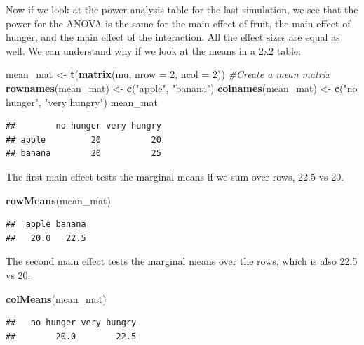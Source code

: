 \documentclass[
]{book}
\newenvironment{Shaded}{\begin{snugshade}}{\end{snugshade}}
\newcommand{\CommentTok}[1]{\textcolor[rgb]{0.56,0.35,0.01}{\textit{#1}}}
\newcommand{\DataTypeTok}[1]{\textcolor[rgb]{0.13,0.29,0.53}{#1}}
\newcommand{\DecValTok}[1]{\textcolor[rgb]{0.00,0.00,0.81}{#1}}
\newcommand{\KeywordTok}[1]{\textcolor[rgb]{0.13,0.29,0.53}{\textbf{#1}}}
\newcommand{\NormalTok}[1]{#1}
\newcommand{\StringTok}[1]{\textcolor[rgb]{0.31,0.60,0.02}{#1}}
\begin{document}
Now if we look at the power analysis table for the last simulation, we see that the power for the ANOVA is the same for the main effect of fruit, the main effect of hunger, and the main effect of the interaction. All the effect sizes are equal as well. We can understand why if we look at the means in a 2x2 table:

\begin{Shaded}
\begin{Highlighting}[]
\NormalTok{mean_mat <-}\StringTok{ }\KeywordTok{t}\NormalTok{(}\KeywordTok{matrix}\NormalTok{(mu, }
                     \DataTypeTok{nrow =} \DecValTok{2}\NormalTok{,}
                     \DataTypeTok{ncol =} \DecValTok{2}\NormalTok{)) }\CommentTok{#Create a mean matrix}
\KeywordTok{rownames}\NormalTok{(mean_mat) <-}\StringTok{ }\KeywordTok{c}\NormalTok{(}\StringTok{"apple"}\NormalTok{, }\StringTok{"banana"}\NormalTok{)}
\KeywordTok{colnames}\NormalTok{(mean_mat) <-}\StringTok{ }\KeywordTok{c}\NormalTok{(}\StringTok{"no hunger"}\NormalTok{, }\StringTok{"very hungry"}\NormalTok{)}
\NormalTok{mean_mat}
\end{Highlighting}
\end{Shaded}

\begin{verbatim}
##        no hunger very hungry
## apple         20          20
## banana        20          25
\end{verbatim}

The first main effect tests the marginal means if we sum over rows, 22.5 vs 20.

\begin{Shaded}
\begin{Highlighting}[]
\KeywordTok{rowMeans}\NormalTok{(mean_mat)}
\end{Highlighting}
\end{Shaded}

\begin{verbatim}
##  apple banana 
##   20.0   22.5
\end{verbatim}

The second main effect tests the marginal means over the rows, which is also 22.5 vs 20.

\begin{Shaded}
\begin{Highlighting}[]
\KeywordTok{colMeans}\NormalTok{(mean_mat)}
\end{Highlighting}
\end{Shaded}

\begin{verbatim}
##   no hunger very hungry 
##        20.0        22.5
\end{verbatim}
\end{document}
